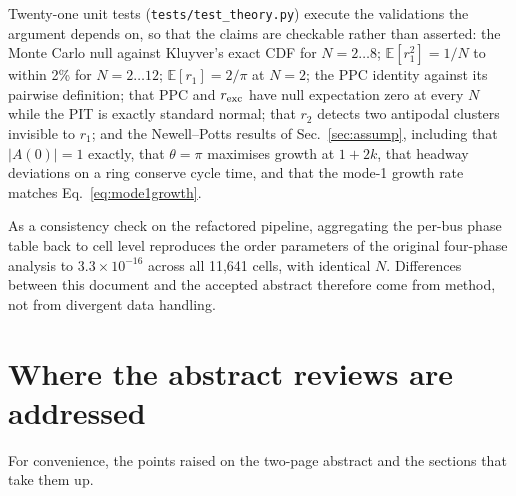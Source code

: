 \documentclass[9pt,twocolumn,twoside]{opticajnl}
\begin{document}
Twenty-one unit tests (\texttt{tests/test\_theory.py}) execute the validations the argument
depends on, so that the claims are checkable rather than asserted: the Monte Carlo null against
Kluyver's exact CDF for $N = 2\ldots8$; $\mathbb{E}[r_1^2] = 1/N$ to within 2\% for
$N = 2\ldots12$; $\mathbb{E}[r_1] = 2/\pi$ at $N=2$; the PPC identity against its pairwise
definition; that PPC and $r_{\rm exc}$ have null expectation zero at every $N$ while the PIT is
exactly standard normal; that $r_2$ detects two antipodal clusters invisible to $r_1$; and the
Newell--Potts results of Sec.~\ref{sec:assump}, including that $|A(0)| = 1$ exactly, that
$\theta = \pi$ maximises growth at $1+2k$, that headway deviations on a ring conserve cycle time,
and that the mode-1 growth rate matches Eq.~\eqref{eq:mode1growth}.

As a consistency check on the refactored pipeline, aggregating the per-bus phase table back to
cell level reproduces the order parameters of the original four-phase analysis to
$3.3\times10^{-16}$ across all 11{,}641 cells, with identical $N$. Differences between this
document and the accepted abstract therefore come from method, not from divergent data handling.

\section{Where the abstract reviews are addressed}\label{app:reviews}

For convenience, the points raised on the two-page abstract and the sections that take them up.
\end{document}
